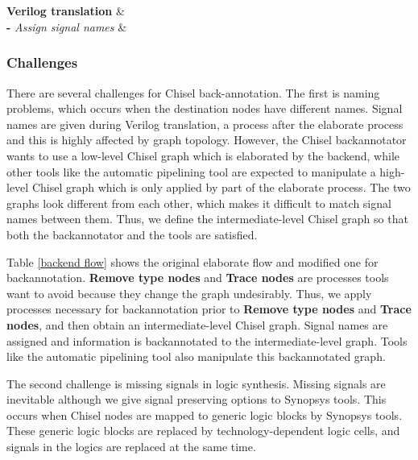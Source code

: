 \begin{table*}
\begin{tabular}
		 \\		
		 \\
		\hline
		{\bf Verilog translation} & \\
		{\bf -} \emph{Assign signal names} & \\
		\hline
	\end{tabular}
	\caption{The original backend elaborate flow vs. The backannotation backend elaborate flow. Note that signal names are assigned to the intermediate-level Chisel graph in the backannotation backend while they are given during Verilog translation in the original backend}
	\label{backend flow}
\end{table*}

\subsubsection{Challenges}
There are several challenges for Chisel back-annotation. The first is naming problems, which occurs when the destination nodes have different names. Signal names are given during Verilog translation, a process after the elaborate process and this is highly affected by graph topology. However, the Chisel backannotator wants to use a low-level Chisel graph which is elaborated by the backend, while other tools like the automatic pipelining tool are expected to manipulate a high-level Chisel graph which is only applied by part of the elaborate process. The two graphs look different from each other, which makes it difficult to match signal names between them. Thus, we define the intermediate-level Chisel graph so that both the backannotator and the tools are satisfied.

Table \ref{backend flow} shows the original elaborate flow and modified one for backannotation. \textbf{Remove type nodes} and \textbf{Trace nodes} are processes tools want to avoid because they change the graph undesirably. Thus, we apply processes necessary for backannotation prior to \textbf{Remove type nodes} and \textbf{Trace nodes}, and then obtain an intermediate-level Chisel graph. Signal names are assigned and information is backannotated to the intermediate-level graph. Tools like the automatic pipelining tool also manipulate this backannotated graph.

The second challenge is missing signals in logic synthesis. Missing signals are inevitable although we give signal preserving options to Synopsys tools. This occurs when Chisel nodes are mapped to generic logic blocks by Synopsys tools. These generic logic blocks are replaced by technology-dependent logic cells, and signals in the logics are replaced at the same time.

